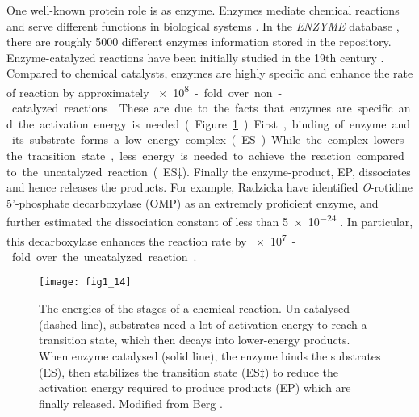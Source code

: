 \begin{refsection}
\begin{table}[htbp]
\begin{tabular}{ lll }
        \hline
    \end{tabular}
    \label{tab:protein-app}
\end{table}
 
One well-known protein role is as enzyme. Enzymes mediate chemical
reactions and serve different functions in biological
systems \cite{AthelCornish-Bowden2012,Stryer1995,Radzicka1995a}. In the
\emph{ENZYME} database \cite{Schomburg2004}, there are roughly 5000 different
enzymes information stored in the repository.  Enzyme-catalyzed reactions have
been initially studied in the 19th century \cite{AthelCornish-Bowden2012}.
Compared to chemical catalysts, enzymes are highly specific and enhance the
rate of reaction by approximately \SI{e8}-fold over non-catalyzed reactions
\cite{Stryer1995}. These are due to the facts that enzymes are specific and the
activation energy is needed (Figure \ref{fig:enzyme-intro}). First, binding
of enzyme and its substrate forms a low energy complex (ES).  While the complex
lowers the transition state, less energy is needed to achieve the reaction
compared to the uncatalyzed reaction (ES$\ddag$).  Finally the enzyme-product, EP,
dissociates and hence releases the products. For example, Radzicka 
have identified \emph{O}-rotidine 5\rq-phosphate decarboxylase (OMP) as an
extremely proficient enzyme, and further estimated the dissociation constant of
less than \SI{5e-24}{\Molar} \cite{Radzicka1995a}. In particular, this
decarboxylase enhances the reaction rate by \SI{e7}-fold over the uncatalyzed
reaction \cite{Radzicka1995a}. 
\begin{figure}[htbp] 
    \centering \texttt{[image: fig1\_14]}
    \caption[The energies of the stages of a chemical reaction. Uncatalysed
    (dashed line), substrates need a lot of activation energy to reach a
transition state, which then decays into lower-energy products. When enzyme
catalysed (solid line), the enzyme binds the substrates (ES), then stabilizes
the transition state (ES$\ddag$) to reduce the activation energy required to produce
products (EP) which are finally released.]{The energies of the stages of a
    chemical reaction. Un-catalysed (dashed line), substrates need a lot of
    activation energy to reach a transition state, which then decays into
    lower-energy products. When enzyme catalysed (solid line), the enzyme binds
    the substrates (ES), then stabilizes the transition state (ES$\ddag$) to reduce
    the activation energy required to produce products (EP) which are finally
    released. Modified from Berg  \cite{Berg2002}.} 
    \label{fig:enzyme-intro}
\end{figure}


\end{refsection}
